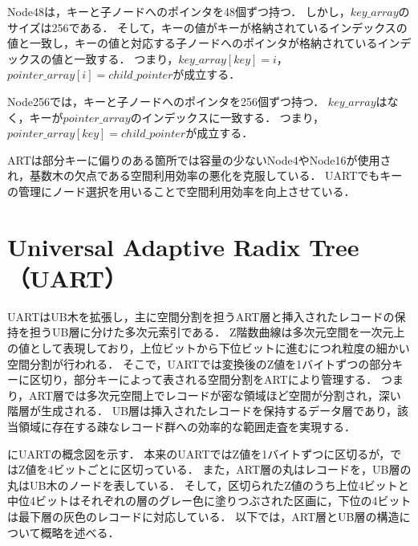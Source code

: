 Node48は，キーと子ノードへのポインタを48個ずつ持つ．
しかし，$key\_array$のサイズは256である．
そして，キーの値がキーが格納されているインデックスの値と一致し，キーの値と対応する子ノードへのポインタが格納されているインデックスの値と一致する．
つまり，$key\_array[key]=i$，$pointer\_array[i]=child\_pointer$が成立する．

Node256では，キーと子ノードへのポインタを256個ずつ持つ．
$key\_array$はなく，キーが$pointer\_array$のインデックスに一致する．
つまり，$pointer\_array[key]=child\_pointer$が成立する．

ARTは部分キーに偏りのある箇所では容量の少ないNode4やNode16が使用され，基数木の欠点である空間利用効率の悪化を克服している．
UARTでもキーの管理にノード選択を用いることで空間利用効率を向上させている．




\chapter{Universal Adaptive Radix Tree（UART）}

UARTはUB木を拡張し，主に空間分割を担うART層と挿入されたレコードの保持を担うUB層に分けた多次元索引である．
Z階数曲線は多次元空間を一次元上の値として表現しており，上位ビットから下位ビットに進むにつれ粒度の細かい空間分割が行われる．
そこで，UARTでは変換後のZ値を1バイトずつの部分キーに区切り，部分キーによって表される空間分割をARTにより管理する．
つまり，ART層では多次元空間上でレコードが密な領域ほど空間が分割され，深い階層が生成される．
UB層は挿入されたレコードを保持するデータ層であり，該当領域に存在する疎なレコード群への効率的な範囲走査を実現する．

\Fig{\ref{fig:uart}}にUARTの概念図を示す．
本来のUARTではZ値を1バイトずつに区切るが，\Fig{\ref{fig:uart}}ではZ値を4ビットごとに区切っている．
また，ART層の丸はレコードを，UB層の丸はUB木のノードを表している．
そして，区切られたZ値のうち上位4ビットと中位4ビットはそれぞれの層のグレー色に塗りつぶされた区画に，下位の4ビットは最下層の灰色のレコードに対応している．
以下では，ART層とUB層の構造について概略を述べる．

